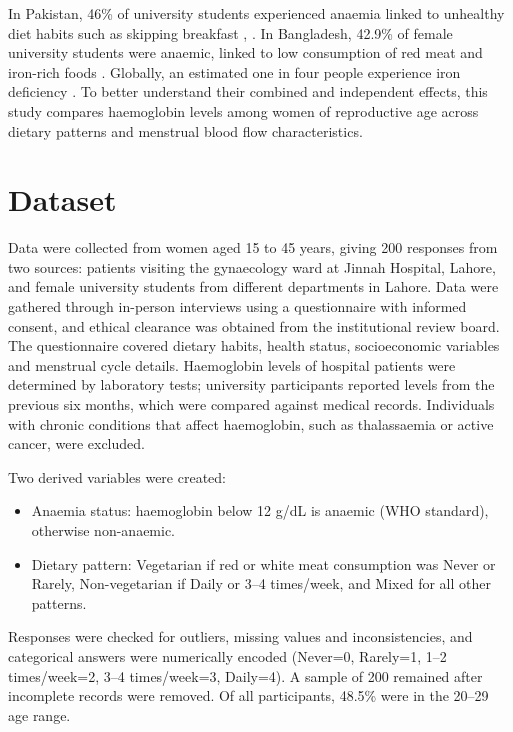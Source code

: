 \documentclass{article}
\begin{document}
In Pakistan, 46\% of university students experienced anaemia linked to unhealthy diet habits such as skipping breakfast \cite{sayed}, \cite{tariq}. In Bangladesh, 42.9\% of female university students were anaemic, linked to low consumption of red meat and iron-rich foods \cite{fardaus}. Globally, an estimated one in four people experience iron deficiency \cite{kolars}. To better understand their combined and independent effects, this study compares haemoglobin levels among women of reproductive age across dietary patterns and menstrual blood flow characteristics.


\section{Dataset}
Data were collected from women aged 15 to 45 years, giving 200 responses from two sources: patients visiting the gynaecology ward at Jinnah Hospital, Lahore, and female university students from different departments in Lahore. Data were gathered through in-person interviews using a questionnaire with informed consent, and ethical clearance was obtained from the institutional review board. The questionnaire covered dietary habits, health status, socioeconomic variables and menstrual cycle details. Haemoglobin levels of hospital patients were determined by laboratory tests; university participants reported levels from the previous six months, which were compared against medical records. Individuals with chronic conditions that affect haemoglobin, such as thalassaemia or active cancer, were excluded.

Two derived variables were created:
\begin{itemize}
  \item Anaemia status: haemoglobin below 12 g/dL is anaemic (WHO standard), otherwise non-anaemic.
  \item Dietary pattern: Vegetarian if red or white meat consumption was Never or Rarely, Non-vegetarian if Daily or 3--4 times/week, and Mixed for all other patterns.
\end{itemize}

Responses were checked for outliers, missing values and inconsistencies, and categorical answers were numerically encoded (Never=0, Rarely=1, 1--2 times/week=2, 3--4 times/week=3, Daily=4). A sample of 200 remained after incomplete records were removed. Of all participants, 48.5\% were in the 20--29 age range.
\end{document}
